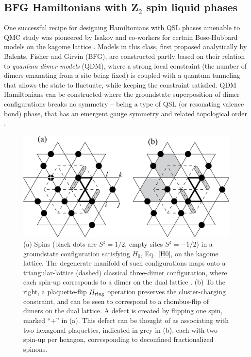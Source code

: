 \documentclass[range]{ar2e}
\begin{document}
\subsection{BFG Hamiltonians with Z$_2$ spin liquid phases}


One successful recipe for designing Hamiltonians with QSL phases amenable to QMC study was pioneered by Isakov and co-workers for certain Bose-Hubbard models on the kagome lattice \cite{Isakov1, Isakov2, TopoEE}.  Models in this class, first proposed analytically by Balents, Fisher and Girvin \cite{BFG} (BFG),
are constructed partly based on their relation to {\it quantum dimer models} (QDM), where a strong local constraint (the number of dimers emanating from a site being fixed) is coupled with a quantum tunneling that allows the state to fluctuate, while keeping the constraint satisfied.  QDM Hamiltonians can be constructed where the groundstate superposition of dimer configurations breaks no symmetry -- being a type of QSL (or resonating valence bond) phase, that has an emergent gauge symmetry and related topological order \cite{Misguich1}.


\begin{figure}
\centerline{\includegraphics[width=4.5in]{kagome}}
\caption{ (a) Spins (black dots are $S^z = 1/2$, empty sites $S^z = -1/2$) in a groundstate configuration satisfying $H_0$, Eq.~\ref{H0}, on the kagome lattice.  
The degenerate manifold of such configurations maps onto a triangular-lattice (dashed) classical three-dimer configuration, where each spin-up corresponds to a dimer 
on the dual lattice \cite{BFG}.  (b) To the right, a plaquette-flip $H_{\rm ring}$ operation preserves the cluster-charging constraint, and can be seen to correspond 
to a rhombus-flip of dimers on the dual lattice.  A defect is created by flipping one spin, marked ``+'' in (a).  This defect can be thought of as associating with 
two hexagonal plaquettes, indicated in grey in (b), each with two spin-up per hexagon, corresponding to deconfined fractionalized spinons.} \label{kag_fig}
\end{figure}
\end{document}
